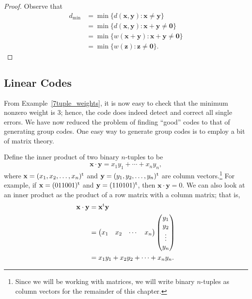  
\begin{proof}
Observe that
\begin{align*}
d_{\min} & =  \min \{ d({\mathbf x},{\mathbf y}) : {\mathbf x}
\neq
{\mathbf y} \} \\
&=  \min \{ d({\mathbf x},{\mathbf y}) : {\mathbf x}+{\mathbf y}
\neq {\mathbf 0} \} \\
&= \min\{ w({\mathbf x} + {\mathbf y}) : {\mathbf x}+{\mathbf y}
\neq {\mathbf 0} \} \\
& =  \min\{ w({\mathbf z}) : {\mathbf z} \neq {\mathbf 0} \}.
\end{align*}
\end{proof}
 
 
\subsection*{Linear Codes}
 
 
From Example~\ref{7tuple_weights}, it is now easy to check that the minimum nonzero
weight is 3; hence, the code does indeed detect and correct all
single errors. We have now reduced the problem of finding ``good''
codes to that of generating group codes. One easy way to generate
group codes is to employ a bit of matrix theory. 
 
 
Define the {\bfi inner product\/} of two binary
$n$-tuples to be 
\[
{\mathbf x} \cdot {\mathbf y} = x_1 y_1 + \cdots + x_n y_n,
\]
where ${\mathbf x} = (x_1, x_2, \ldots, x_n)^{\rm t}$ and ${\mathbf y} =
(y_1, y_2, \ldots, y_n)^{\rm t}$ are column vectors.\footnote{Since we
will be working with matrices, we will write binary $n$-tuples as
column vectors for the remainder of this chapter.} For example, if
${\mathbf x} = (011001)^{\rm t}$ and ${\mathbf y} = (110101)^{\rm t}$,
then ${\mathbf x} \cdot {\mathbf y} = 0$. We can also look at an inner
product as the product of a row matrix with a column matrix; that is, 
\begin{align*}
{\mathbf x} \cdot {\mathbf y} & = {\mathbf x}^{\rm t}  {\mathbf y}
\\
& =
\begin{pmatrix}
x_1 & x_2 & \cdots & x_n
\end{pmatrix}
\begin{pmatrix}
y_1 \\
y_2 \\
\vdots \\
y_n
\end{pmatrix} \\
& =
x_{1}y_{1} + x_{2}y_{2} + \cdots + x_{n}y_{n}.
\end{align*}
 
